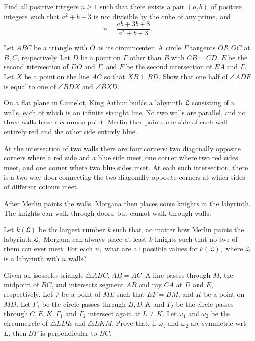 \documentclass[11pt]{scrartcl}
\begin{document}
\begin{problem}[4375421764909014892]
	Find all positive integers $n\geq1$ such that there exists a pair $(a,b)$ of positive integers, such that $a^2+b+3$ is not divisible by the cube of any prime, and$$n=\frac{ab+3b+8}{a^2+b+3}.$$
\end{problem}
\begin{problem}[537574018594693]
Let $ABC$ be a triangle with $O$ as its circumcenter. A circle $\Gamma$ tangents $OB, OC$ at $B, C$, respectively. Let $D$ be a point on $\Gamma$ other than $B$ with $CB=CD$, $E$ be the second intersection of $DO$ and $\Gamma$, and $F$ be the second intersection of $EA$ and $\Gamma$. Let $X$ be a point on the line $AC$ so that $XB\perp BD$. Show that one half of $\angle ADF$ is equal to one of $\angle BDX$ and $\angle BXD$.
\end{problem}
\begin{problem}[2252133047011954512]
On a flat plane in Camelot, King Arthur builds a labyrinth $\mathfrak{L}$ consisting of $n$ walls, each of which is an infinite straight line. No two walls are parallel, and no three walls have a common point. Merlin then paints one side of each wall entirely red and the other side entirely blue.

At the intersection of two walls there are four corners: two diagonally opposite corners where a red side and a blue side meet, one corner where two red sides meet, and one corner where two blue sides meet. At each such intersection, there is a two-way door connecting the two diagonally opposite corners at which sides of different colours meet.

After Merlin paints the walls, Morgana then places some knights in the labyrinth. The knights can walk through doors, but cannot walk through walls.

Let $k(\mathfrak{L})$ be the largest number $k$ such that, no matter how Merlin paints the labyrinth $\mathfrak{L},$ Morgana can always place at least $k$ knights such that no two of them can ever meet. For each $n,$ what are all possible values for $k(\mathfrak{L}),$ where $\mathfrak{L}$ is a labyrinth with $n$ walls?
\end{problem}
\begin{problem}[1620616963605432410]
Given an isosceles triangle $\triangle ABC$, $AB=AC$. A line passes through $M$, the midpoint of $BC$, and intersects segment $AB$ and ray $CA$ at $D$ and $E$, respectively. Let $F$ be a point of $ME$ such that $EF=DM$, and $K$ be a point on $MD$. Let $\Gamma_1$ be the circle passes through $B,D,K$ and $\Gamma_2$ be the circle passes through $C,E,K$. $\Gamma_1$ and $\Gamma_2$ intersect again at $L \neq K$. Let $\omega_1$ and $\omega_2$ be the circumcircle of $\triangle LDE$ and $\triangle LKM$. Prove that, if $\omega_1$ and $\omega_2$ are symmetric wrt $L$, then $BF$ is perpendicular to $BC$.
\end{problem}
\end{document}
